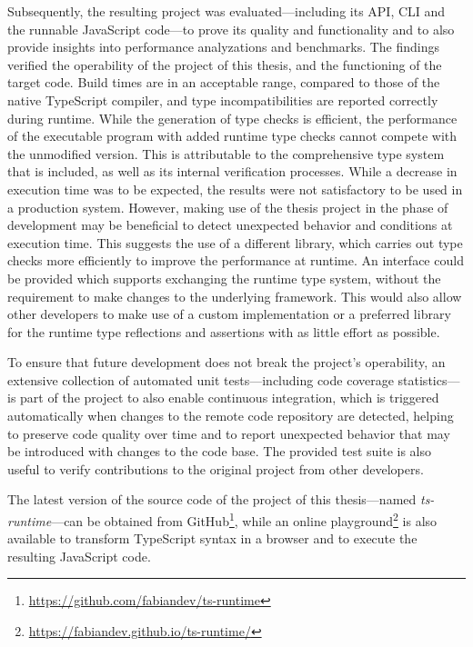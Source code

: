 Subsequently, the resulting project was evaluated---including its API, CLI and the runnable JavaScript code---to prove its quality and functionality and to also provide insights into performance analyzations and benchmarks. The findings verified the operability of the project of this thesis, and the functioning of the target code. Build times are in an acceptable range, compared to those of the native TypeScript compiler, and type incompatibilities are reported correctly during runtime. While the generation of type checks is efficient, the performance of the executable program with added runtime type checks cannot compete with the unmodified version. This is attributable to the comprehensive type system that is included, as well as its internal verification processes. While a decrease in execution time was to be expected, the results were not satisfactory to be used in a production system. However, making use of the thesis project in the phase of development may be beneficial to detect unexpected behavior and conditions at execution time. This suggests the use of a different library, which carries out type checks more efficiently to improve the performance at runtime. An interface could be provided which supports exchanging the runtime type system, without the requirement to make changes to the underlying framework. This would also allow other developers to make use of a custom implementation or a preferred library for the runtime type reflections and assertions with as little effort as possible.

To ensure that future development does not break the project's operability, an extensive collection of automated unit tests---including code coverage statistics---is part of the project to also enable continuous integration, which is triggered automatically when changes to the remote code repository are detected, helping to preserve code quality over time and to report unexpected behavior that may be introduced with changes to the code base. The provided test suite is also useful to verify contributions to the original project from other developers.

The latest version of the source code of the project of this thesis---named \emph{ts-runtime}---can be obtained from GitHub\footnote{\url{https://github.com/fabiandev/ts-runtime}}, while an online playground\footnote{\url{https://fabiandev.github.io/ts-runtime/}} is also available to transform TypeScript syntax in a browser and to execute the resulting JavaScript code.
